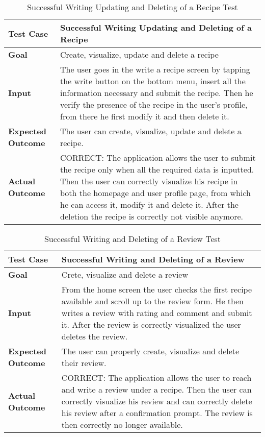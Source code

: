 \begin{table}[H]
	\centering
	\begin{tabular}{|l|l|}
		\hline
		\textbf{Test Case}& Successful Writing Updating and Deleting of a Recipe\\
		\hline
		\textbf{Goal}&Create, visualize, update and delete a recipe\\
		\hline
		\textbf{Input}& 
		\begin{minipage}{.7\linewidth}
			The user goes in the write a recipe screen by tapping the write button on the bottom menu, insert all the information necessary and submit the recipe. Then he verify the presence of the recipe in the user's profile, from there he first modify it and then delete it.
		\end{minipage}\\
		\hline
		\textbf{Expected Outcome}& The user can create, visualize, update and delete a recipe.\\
		\hline
		\textbf{Actual Outcome}& 
		\begin{minipage}{.7\linewidth}
			CORRECT: The application allows the user to submit the recipe only when all the required data is inputted. Then the user can correctly visualize his recipe in both the homepage and user profile page, from which he can access it, modify it and delete it. After the deletion the recipe is correctly not visible anymore.
		\end{minipage}\\
		\hline	
	\end{tabular}
	\caption{Successful Writing Updating and Deleting of a Recipe Test}
\end{table}

\begin{table}[H]
	\centering
	\begin{tabular}{|l|l|}
		\hline
		\textbf{Test Case}& Successful Writing and Deleting of a Review\\
		\hline
		\textbf{Goal}& Crete, visualize and delete a review\\
		\hline
		\textbf{Input}& 
		\begin{minipage}{.7\linewidth}
			From the home screen the user checks the first recipe available and scroll up to the review form. He then writes a review with rating and comment and submit it. After the review is correctly visualized the user deletes the review.
		\end{minipage}\\
		\hline
		\textbf{Expected Outcome}& The user can properly create, visualize and delete their review.\\
		\hline
		\textbf{Actual Outcome}& 
		\begin{minipage}{.7\linewidth}
			CORRECT: The application allows the user to reach and write a review under a recipe. Then the user can correctly visualize his review and can correctly delete his review after a confirmation prompt. The review is then correctly no longer available.
		\end{minipage}\\
		\hline	
	\end{tabular}
	\caption{Successful Writing and Deleting of a Review Test}
\end{table}

